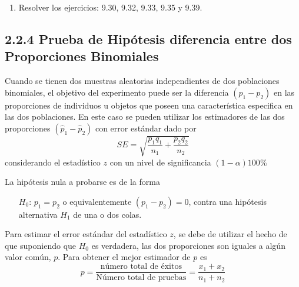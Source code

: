 \begin{frame}
\begin{frame}
\begin{enumerate}
\item Resolver los ejercicios: 9.30, 9.32, 9.33, 9.35 y 9.39.
\end{enumerate}






\subsection{2.2.4 Prueba de Hip\'otesis diferencia entre dos Proporciones Binomiales}






\begin{Note}
Cuando se tienen dos muestras aleatorias independientes de dos poblaciones binomiales, el objetivo del experimento puede ser la diferencia $\left(p_{1}-p_{2}\right)$ en las proporciones de individuos u objetos que poseen una caracter\'istica especifica en las dos poblaciones. En este caso se pueden utilizar los estimadores de las dos proporciones $\left(\hat{p}_{1}-\hat{p}_{2}\right)$ con error est\'andar dado por
$$SE=\sqrt{\frac{p_{1}q_{1}}{n_{1}}+\frac{p_{2}q_{2}}{n_{2}}}$$
considerando el estad\'istico $z$ con un nivel de significancia $\left(1-\alpha\right)100\%$

\end{Note}


\begin{Note}
La hip\'otesis nula a probarse es de la forma
\begin{itemize}
\item[$H_{0}$: ] $p_{1}=p_{2}$ o equivalentemente $\left(p_{1}-p_{2}\right)=0$, contra una hip\'otesis alternativa $H_{1}$ de una o dos colas.
\end{itemize}
\end{Note}







\begin{Note}
Para estimar el error est\'andar del estad\'istico $z$, se debe de utilizar el hecho de que suponiendo que $H_{0}$ es verdadera, las dos proporciones son iguales a alg\'un valor com\'un, $p$. Para obtener el mejor estimador de $p$ es
$$p=\frac{\textrm{n\'umero total de \'exitos}}{\textrm{N\'umero total de pruebas}}=\frac{x_{1}+x_{2}}{n_{1}+n_{2}}$$
\end{Note}




\end{frame}
\end{frame}
